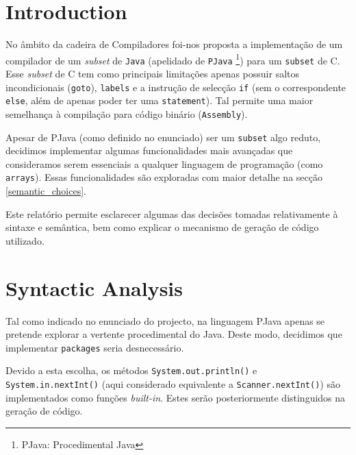 \documentclass[a4paper]{article}
\title{\documentTitle}
\author{\documentAuthors{}}
\begin{document}
\renewcommand{\figurename}{Figure}
\renewcommand{\contentsname}{Contents}

\maketitle
\cleardoublepage

\tableofcontents
\cleardoublepage

\setlength{\parindent}{1cm}
\setlength{\parskip}{0.3cm}

\section{Introduction}
\indent \indent No âmbito da cadeira de Compiladores foi-nos proposta a implementação de um compilador de um \textit{subset} de \texttt{Java} (apelidado de
\texttt{PJava} \footnote[1]{PJava: Procedimental Java}) para um \texttt{subset} de C. Esse \textit{subset} de C tem como principais limitações
apenas possuir saltos incondicionais (\texttt{goto}), \texttt{labels} e a instrução de selecção \texttt{if} (sem o correspondente \texttt{else}, além de apenas poder
ter uma \texttt{statement}). Tal permite uma maior semelhança à compilação para código binário (\texttt{Assembly}).

\indent Apesar de PJava (como definido no enunciado) ser um \texttt{subset} algo reduto, decidimos implementar algumas funcionalidades mais avançadas que consideramos
serem essenciais a qualquer linguagem de programação (como \texttt{arrays}). Essas funcionalidades são exploradas com maior detalhe na secção \ref{semantic_choices}.

\indent Este relatório permite esclarecer algumas das decisões tomadas relativamente à sintaxe e semântica, bem como explicar o mecanismo de geração de código
utilizado.

\cleardoublepage

\section{Syntactic Analysis} %
\label{syntactic_analysis}
\indent \indent Tal como indicado no enunciado do projecto, na linguagem PJava apenas se pretende explorar a vertente procedimental do Java. 
Deste modo, decidimos que implementar \texttt{packages} seria desnecessário.

\indent Devido a esta escolha, os métodos \texttt{System.out.println()} e \texttt{System.in.nextInt()} (aqui considerado equivalente a \texttt{Scanner.nextInt()})
são implementados como funções \emph{built-in}. Estes serão posteriormente distinguidos na geração de código.
\end{document}

